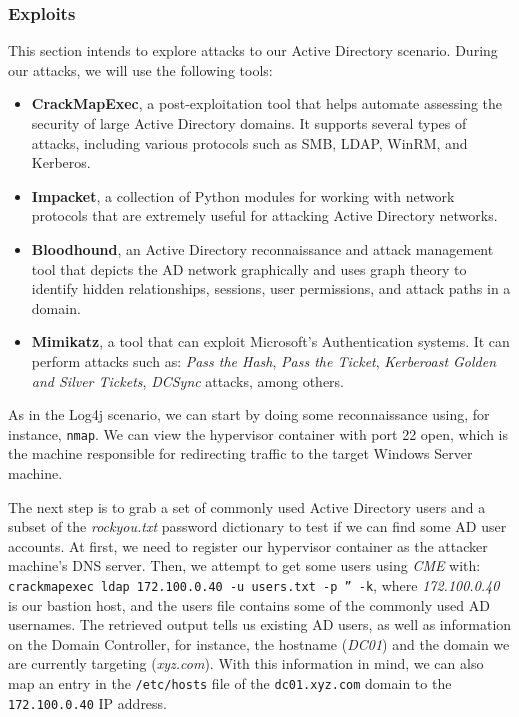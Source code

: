 \subsubsection{Exploits} \label{sec:validation_ad_exploit}

This section intends to explore attacks to our Active Directory scenario. During our attacks, we will use the following tools:

\begin{itemize}
    \item \textbf{CrackMapExec}, a post-exploitation tool that helps automate assessing the security of large Active Directory domains. It supports several types of attacks, including various protocols such as SMB, LDAP, WinRM, and Kerberos.
    \item \textbf{Impacket}, a collection of Python modules for working with network protocols that are extremely useful for attacking Active Directory networks.
    \item \textbf{Bloodhound}, an Active Directory reconnaissance and attack management tool that depicts the AD network graphically and uses graph theory to identify hidden relationships, sessions, user permissions, and attack paths in a domain.
    \item \textbf{Mimikatz}, a tool that can exploit Microsoft's Authentication systems. It can perform attacks such as: \textit{Pass the Hash}, \textit{Pass the Ticket}, \textit{Kerberoast Golden and Silver Tickets}, \textit{DCSync} attacks, among others. 
\end{itemize}

As in the Log4j scenario, we can start by doing some reconnaissance using, for instance, \texttt{nmap}. We can view the hypervisor container with port 22 open, which is the machine responsible for redirecting traffic to the target Windows Server machine.

The next step is to grab a set of commonly used Active Directory users and a subset of the \textit{rockyou.txt} password dictionary to test if we can find some AD user accounts. At first, we need to register our hypervisor container as the attacker machine's DNS server. Then, we attempt to get some users using \textit{CME} with: \texttt{crackmapexec ldap 172.100.0.40 -u users.txt -p '' -k}, where \textit{172.100.0.40} is our bastion host, and the users file contains some of the commonly used AD usernames. The retrieved output tells us existing AD users, as well as information on the Domain Controller, for instance, the hostname (\textit{DC01}) and the domain we are currently targeting (\textit{xyz.com}). With this information in mind, we can also map an entry in the \texttt{/etc/hosts} file of the \texttt{dc01.xyz.com} domain to the \texttt{172.100.0.40} IP address.

